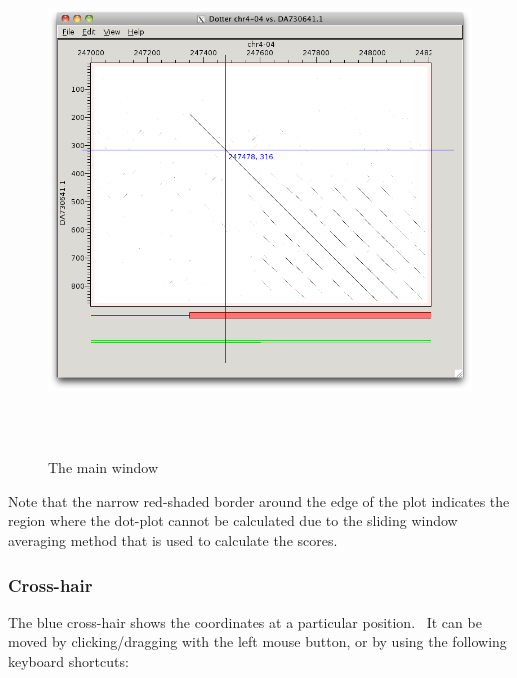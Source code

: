 \documentclass{report}
\begin{document}
\begin{figure}
 \centering
 \color[rgb]{0.30980393,0.5058824,0.7411765}
  \includegraphics[width=14.88cm,height=13.457cm]{img_window_main.png}
 \caption{The main window}
\end{figure}

\bigskip

{Note that the narrow red-shaded border around the edge of the plot
indicates the region where the dot-plot cannot be calculated due to the
sliding window averaging method that is used to calculate the scores. }

\bigskip
{\color[rgb]{0.30980393,0.5058824,0.7411765}\subsubsection[Cross{}-hair]{Cross-hair}}
{The blue cross-hair shows the coordinates at a particular position. \ It
can be moved by clicking/dragging with the left mouse button, or by
using the following keyboard shortcuts:}
\end{document}
